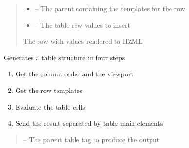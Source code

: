 \documentclass[letterpaper,10pt,english]{sphinxmanual}
\begin{document}
\begin{savenotes}
\begin{fulllineitems}
\begin{savenotes}
\begin{fulllineitems}
\begin{quote}
\begin{description}
\begin{itemize}
\item {} 
\sphinxAtStartPar
{} – The parent containing the templates for the row

\item {} 
\sphinxAtStartPar
{} – The table row values to insert

\end{itemize}

\sphinxAtStartPar
The row with values rendered to HZML

\end{description}\end{quote}

\end{fulllineitems}\end{savenotes}


\begin{savenotes}\begin{fulllineitems}
\label{\detokenize{eezz:eezz.http_agent.THttpAgent.generate_html_table}}
\pysigstartsignatures
{}
\pysigstopsignatures
\sphinxAtStartPar
Generates a table structure in four steps
\begin{enumerate}
%
\item {} 
\sphinxAtStartPar
Get the column order and the viewport

\item {} 
\sphinxAtStartPar
Get the row templates

\item {} 
\sphinxAtStartPar
Evaluate the table cells

\item {} 
\sphinxAtStartPar
Send the result separated by table main elements

\end{enumerate}
\begin{quote}\begin{description}
\sphinxAtStartPar
{} – The parent table tag to produce the output


\end{description}
\end{quote}
\end{fulllineitems}
\end{savenotes}
\end{fulllineitems}
\end{savenotes}
\end{document}
